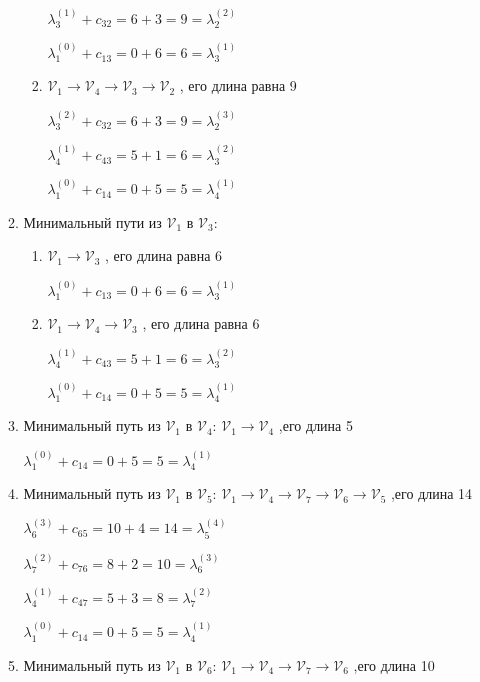 \begin{enumerate}
\begin{enumerate}
\begin{enumerate}
$\lambda^{(1)}_3 + c_{32} = 6 + 3 = 9 = \lambda^{(2)}_2$

$\lambda^{(0)}_1 + c_{13} = 0 + 6 = 6 = \lambda^{(1)}_3 $

\item $\mathcal{V}_1\rightarrow\mathcal{V}_4\rightarrow\mathcal{V}_3\rightarrow\mathcal{V}_2$ , его длина равна 9

$\lambda^{(2)}_3 + c_{32} = 6 + 3 = 9 = \lambda^{(3)}_2$

$\lambda^{(1)}_4 + c_{43} = 5 + 1 = 6 = \lambda^{(2)}_3$

$\lambda^{(0)}_1 + c_{14} = 0 + 5 = 5 = \lambda^{(1)}_4$

\end{enumerate}
\item Минимальный пути из $\mathcal{V}_1$ в $\mathcal{V}_3$:
\begin{enumerate}
\item $\mathcal{V}_1\rightarrow\mathcal{V}_3$ , его длина равна 6

$\lambda^{(0)}_1 + c_{13} = 0 + 6 = 6 = \lambda^{(1)}_3 $

\item $\mathcal{V}_1\rightarrow\mathcal{V}_4\rightarrow\mathcal{V}_3$ , его длина равна 6


$\lambda^{(1)}_4 + c_{43} = 5 + 1 = 6 = \lambda^{(2)}_3$

$\lambda^{(0)}_1 + c_{14} = 0 + 5 = 5 = \lambda^{(1)}_4$
\end{enumerate}
\item Минимальный путь из $\mathcal{V}_1$ в $\mathcal{V}_4$: $\mathcal{V}_1\rightarrow\mathcal{V}_4$ ,его длина 5

$\lambda^{(0)}_1 + c_{14} = 0 + 5 = 5 = \lambda^{(1)}_4$

\item Минимальный путь из $\mathcal{V}_1$ в $\mathcal{V}_5$: $\mathcal{V}_1\rightarrow\mathcal{V}_4\rightarrow\mathcal{V}_7\rightarrow\mathcal{V}_6\rightarrow\mathcal{V}_5$ ,его длина 14

$\lambda^{(3)}_6 + c_{65} = 10 + 4 = 14 = \lambda^{(4)}_5$

$\lambda^{(2)}_7 + c_{76} = 8 + 2 = 10 = \lambda^{(3)}_6$

$\lambda^{(1)}_4 + c_{47} = 5 + 3 = 8 = \lambda^{(2)}_7$

$\lambda^{(0)}_1 + c_{14} = 0 + 5 = 5 = \lambda^{(1)}_4$

\item Минимальный путь из $\mathcal{V}_1$ в $\mathcal{V}_6$: $\mathcal{V}_1\rightarrow\mathcal{V}_4\rightarrow\mathcal{V}_7\rightarrow\mathcal{V}_6$ ,его длина 10


\end{enumerate}
\end{enumerate}

